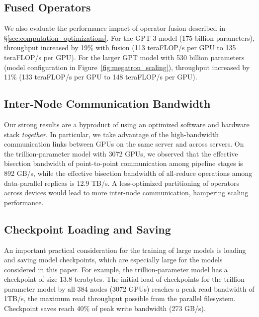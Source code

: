 \subsection{Fused Operators}
We also evaluate the performance impact of operator fusion described in \S\ref{sec:computation_optimizations}. For the GPT-3 model (175 billion parameters), throughput increased by 19\% with fusion (113 teraFLOP/s per GPU to 135 teraFLOP/s per GPU). For the larger GPT model with 530 billion parameters (model configuration in Figure~\ref{fig:megatron_scaling}), throughput increased by 11\% (133 teraFLOP/s per GPU to 148 teraFLOP/s per GPU).


\subsection{Inter-Node Communication Bandwidth}
Our strong results are a byproduct of using an optimized software and hardware stack \emph{together}. In particular, we take advantage of the high-bandwidth communication links between GPUs on the same server and across servers. On the trillion-parameter model with 3072 GPUs, we observed that the effective bisection bandwidth of point-to-point communication among pipeline stages is 892 GB/s, while the effective bisection bandwidth of all-reduce operations among data-parallel replicas is 12.9 TB/s. A less-optimized partitioning of operators across devices would lead to more inter-node communication, hampering scaling performance.


\subsection{Checkpoint Loading and Saving}

An important practical consideration for the training of large models is loading and saving model checkpoints, which are especially large for the models considered in this paper. For example, the trillion-parameter model has a checkpoint of size 13.8 terabytes. The initial load of checkpoints for the trillion-parameter model by all 384 nodes (3072 GPUs) reaches a peak read bandwidth of 1TB/s, the maximum read throughput possible from the parallel filesystem. Checkpoint saves reach 40\% of peak write bandwidth (273 GB/s).